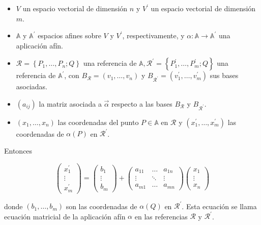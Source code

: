 \documentclass[12pt, a4paper, ones, notitlepage, openany,titlepage]{article}
\begin{document}
\begin{itemize}

\item$V$ un espacio vectorial de dimensión $n$ y $V^{\prime}$ un espacio vectorial de dimensión $m$.
\item$\mathbb{A}$ y $\mathbb{A}^{\prime}$ espacios afines sobre $V$ y $V^{\prime}$, respectivamente, y $\alpha: \mathbb{A} \rightarrow \mathbb{A}^{\prime}$ una aplicación afín.
\item$\mathcal{R}=\left\{P_{1}, \ldots, P_{n} ; Q\right\}$ una referencia de $\mathbb{A}, \mathcal{R}^{\prime}=\left\{P_{1}^{\prime}, \ldots, P_{m}^{\prime} ; Q\right\}$ una referencia de $\mathbb{A}^{\prime}$, con $B_{\mathcal{R}}=\left(v_{1}, \ldots, v_{n}\right)$ y $B_{\mathcal{R}^{\prime}}=\left(v_{1}^{\prime}, \ldots, v_{m}^{\prime}\right)$ sus bases asociadas.

\item$\left(a_{i j}\right)$ la matriz asociada a $\vec{\alpha}$ respecto a las bases $B_{\mathcal{R}}$ y $B_{\mathcal{R}^{\prime}}$. \item$\left(x_{1}, \ldots, x_{n}\right)$ las coordenadas del punto $P \in \mathbb{A}$ en $\mathcal{R}$ y $\left(x_{1}^{\prime}, \ldots, x_{m}^{\prime}\right)$ las coordenadas de $\alpha(P)$ en $\mathcal{R}^{\prime}$.

\end{itemize}

Entonces

$$
\left(\begin{array}{c}
x_{1}^{\prime} \\
\vdots \\
x_{m}^{\prime}
\end{array}\right)=\left(\begin{array}{c}
b_{1} \\
\vdots \\
b_{m}
\end{array}\right)+\left(\begin{array}{ccc}
a_{11} & \ldots & a_{1 n} \\
\vdots & \ddots & \vdots \\
a_{m 1} & \ldots & a_{m n}
\end{array}\right)\left(\begin{array}{c}
x_{1} \\
\vdots \\
x_{n}
\end{array}\right)
$$

donde $\left(b_{1}, \ldots, b_{m}\right)$ son las coordenadas de $\alpha(Q)$ en $\mathcal{R}^{\prime}$. Esta ecuación se llama ecuación matricial de la aplicación afín $\alpha$ en las referencias $\mathcal{R}$ y $\mathcal{R}^{\prime}$.\\
\end{document}
